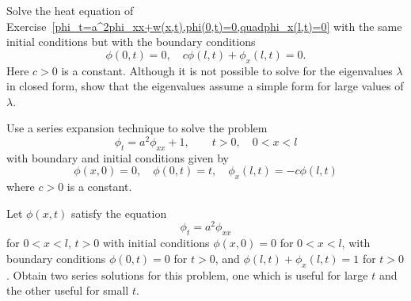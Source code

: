 {\begin{Exercise}
\end{Exercise}





\begin{Exercise}
  \label{exercise heat p=0 cp+px=0}
  \label{Heat_equation,phi(0,t)=0,quadcphi(l,t)+phi_x(l,t)=0}
  Solve the heat equation of 
  Exercise~\ref{phi_t=a^2phi_xx+w(x,t),phi(0,t)=0,quadphi_x(l,t)=0} with the
  same initial conditions but with the boundary conditions
  \[
  \phi(0,t) = 0, \quad c \phi(l,t) + \phi_x(l,t) = 0.
  \]
  Here $c > 0$ is a constant. Although it is not possible to solve for the
  eigenvalues $\lambda$ in closed form, show that the
  eigenvalues assume a simple form for large values of $\lambda$.

\end{Exercise}





\begin{Exercise}
  \label{exercise heat p=t px=-cp}
  Use a series expansion technique to solve the 
  problem
  \[
  \phi_t = a^2\phi_{xx} + 1, \qquad t > 0,\quad 0 < x < l
  \]
  with boundary and initial conditions given by
  \[
  \phi(x,0) = 0, \quad \phi(0,t) = t, \quad \phi_x(l,t) = - c\phi(l,t)
  \]
  where $c > 0$ is a constant.

\end{Exercise}




\begin{Exercise}
  \label{exercise heat radiation bc 2 series solutions}
  Let $\phi(x,t)$ satisfy the equation 
  \[
  \phi_t = a^2\phi_{xx}
  \]
  for $0 < x< l$, $ t > 0$ with initial conditions $\phi(x,0) = 0$
  for $0 < x < l$, with boundary conditions $\phi(0,t) = 0$ for $ t >
  0$, and $\phi(l,t) + \phi_x(l,t) = 1 $ for $ t > 0$. Obtain two series
  solutions for this problem, one which is useful for large $t$ and the
  other useful for small $t$.

\end{Exercise}





}
